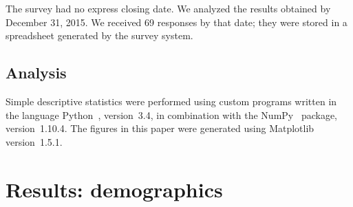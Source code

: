 \documentclass{casicswhitepaper}
\newcommand{\totalrespondents}{69\xspace}
\begin{document}
The survey had no express closing date.  We analyzed the results obtained by December 31, 2015.  We received \totalrespondents responses by that date; they were stored in a spreadsheet generated by the survey system.


\subsection{Analysis}

Simple descriptive statistics were performed using custom programs written in the language Python~\cite{vanRossum1991interactively, perez2011python}, version~3.4, in combination with the NumPy~\cite{vanderwalt2011numpy} package, version~1.10.4.  The figures in this paper were generated using Matplotlib~\cite{hunter2007matplotlib} version~1.5.1.


\section{Results: demographics}
\label{demographics}

%
%
%
%
%
\end{document}
